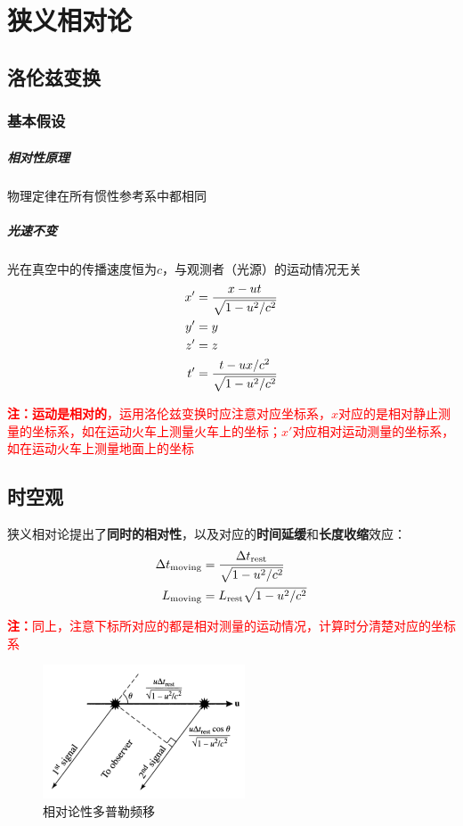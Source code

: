 \documentclass[openany]{ctexbook}
\begin{document}
\chapter{狭义相对论}
\section{洛伦兹变换}
\subsection{基本假设}
\paragraph{相对性原理}
物理定律在所有惯性参考系中都相同
\paragraph{光速不变}
光在真空中的传播速度恒为$c$，与观测者（光源）的运动情况无关
\begin{align}
  x' &={x-ut \over \sqrt{1-u^2/c^2}}\\
  y' &=y\\
  z' &=z\\
  t' &={t-ux/c^2 \over \sqrt{1-u^2/c^2}}
\end{align}

\textcolor{red}{{\bf 注：运动是相对的}，运用洛伦兹变换时应注意对应坐标系，$x$对应的是相对静止测量的坐标系，如在运动火车上测量火车上的坐标；$x'$对应相对运动测量的坐标系，如在运动火车上测量地面上的坐标}

\section{时空观}
狭义相对论提出了{\bf 同时的相对性}，以及对应的\textbf{时间延缓}和\textbf{长度收缩}效应：
\begin{align}
  \Delta t_\mathrm{moving}&={\Delta t_\mathrm{rest} \over \sqrt{1-u^2/c^2}}\\
  L_\mathrm{moving}&=L_\mathrm{rest}\sqrt{1-u^2/c^2}
\end{align}

\textcolor{red}{{\bf 注：}同上，注意下标所对应的都是相对测量的运动情况，计算时分清楚对应的坐标系}

\begin{figure}[hbt]
  \centering
  \includegraphics[width=6cm]{chapters/04/dopper}
  \caption{相对论性多普勒频移}
  \label{fig:doppler}
\end{figure}
\end{document}
